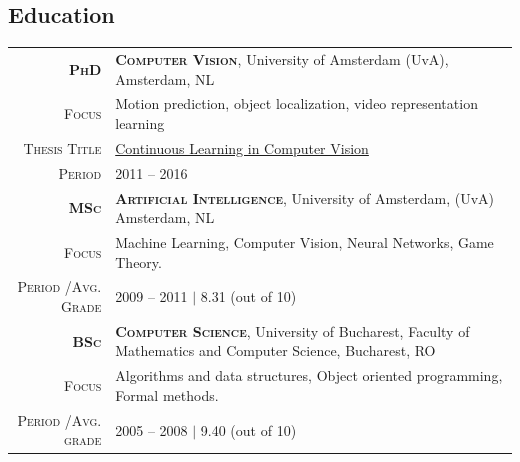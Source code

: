 \documentclass[a4paper, oneside, final]{scrartcl}
\newcommand{\gray}{\rowcolor[gray]{.90}}
\begin{document}
\begin{center}
		\section{Education}
		\begin{tabular}{r@{\hskip 0.3in}p{12.3cm}}
			\gray \textsc{\textbf{PhD}}     & \textbf{\textsc{Computer Vision}}, University of Amsterdam (UvA), Amsterdam, NL\\
			\textsc{Focus}                  & Motion prediction, object localization, video representation learning \\
			\textsc{Thesis Title}           & {\href{http://dare.uva.nl/search?identifier=90ad88f5-c16e-4450-86f2-23faa250fcab}{Continuous Learning in Computer Vision}}\\
            \textsc{Period}                 & \textsc{2011 -- 2016}
            \vspace{5px}\\
			\gray \textsc{\textbf{MSc}}         & \textbf{\textsc{Artificial Intelligence}}, University of Amsterdam, (UvA) Amsterdam, NL\\
			\textsc{Focus}                      & Machine Learning, Computer Vision, Neural Networks, Game Theory.\\
			\textsc{Period \slash Avg. Grade}   & \textsc{2009  -- 2011} $|$ 8.31 (out of 10)
            \vspace{5px}\\
			\gray \textsc{\textbf{BSc}}         & \textbf{\textsc{Computer Science}}, University of Bucharest, Faculty of Mathematics and Computer Science, Bucharest, RO\\
			\textsc{Focus}                      & Algorithms and data structures, Object oriented programming, Formal methods.\\ 
			\textsc{Period \slash Avg. grade}   & \textsc{2005 -- 2008} $|$ 9.40 (out of 10)
		\end{tabular}

\end{center}
\end{document}
